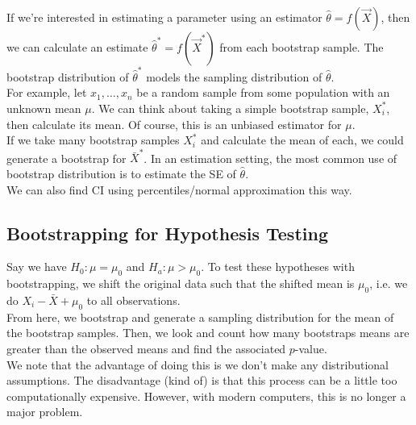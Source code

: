 \documentclass{book}
\theoremstyle{definition}
\begin{document}
If we're interested in estimating a parameter using an estimator $\hat{\theta} = f(\vec{X})$, then we can calculate an estimate $\hat{\theta}^* = f(\vec{X}^*)$ from each bootstrap sample. The bootstrap distribution of $\hat\theta^*$ models the sampling distribution of $\hat\theta$. \\

For example, let $x_1, \dots, x_n$ be a random sample from some population with an unknown mean $\mu$. We can think about taking a simple bootstrap sample, $X_i^*$, then calculate its mean. Of course, this is an unbiased estimator for $\mu$. \\

If we take many bootstrap samples $X^*_i$ and calculate the mean of each, we could generate a bootstrap for $\bar{X}^*$. In an estimation setting, the most common use of bootstrap distribution is to estimate the SE of $\hat\theta$. \\

We can also find CI using percentiles/normal approximation this way.\\



\subsection{Bootstrapping for Hypothesis Testing}



Say we have $H_0 : \mu = \mu_0$ and $H_a : \mu > \mu_0$. To test these hypotheses with bootstrapping, we shift the original data such that the shifted mean is $\mu_0$, i.e. we do $X_i - \bar{X} + \mu_0$ to all observations. \\

From here, we bootstrap and generate a sampling distribution for the mean of the bootstrap samples. Then, we look and count how many bootstraps means are greater than the observed means and find the associated $p$-value. \\

We note that the advantage of doing this is we don't make any distributional assumptions. The disadvantage (kind of) is that this process can be a little too computationally expensive. However, with modern computers, this is no longer a major problem. \\
\end{document}
